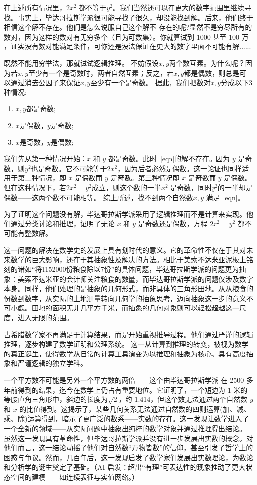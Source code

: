 在上述所有情况里，$2x^2$ 都不等于$y^2$。我们当然还可以在更大的数字范围里继续寻找。事实上，毕达哥拉斯学派很可能寻找了很久，却没能找到解。后来，他们终于相信这个解不存在。他们是怎么说服自己这个解不 存在的呢?显然不是穷尽所有的数对，因为这样的数对有{无穷多个（且为可数集）}。你就算试到 1000 甚至 100 万 ，证实没有数对能满足条件，可你还是没法保证在更大的数字里面不可能有解......

既然不能用穷举法，那就试试逻辑推理。 
不妨假设$x,y$两个数互素。为什么呢？因为若$x,y$至少有一个是奇数时，两者自然互素；反之，若$x,y$都是偶数，则总是可以通过消去公因子来保证$x,y$至少有一个是奇数。
据此，我们把数对$x,y$分成以下3种情况: 
\begin{enumerate}
\item $x,y$都是奇数;
\item $x$是偶数，$y$是奇数;
\item $x$是奇数，$y$是偶数;
\end{enumerate}

我们先从第一种情况开始：$x$ 和 $y$ 都是奇数。此时~\eqref{eqn}的解不存在。因为 $y$ 是奇数，则$y^2$也是奇数。它不可能等于$2x^2$，因为后者必然是偶数。这一论证也同样适用于第二种情况，即 $x$ 是偶数而 $y$ 是奇数。第三种情况即 $x$ 是奇数而 $y$ 是偶数。但在这种情况下，若$2x^2=y^2$成立，则这个数的一半$x^2$ 是奇数，同时$y^2$的一半却是偶数——这两个数不可能相等。
综上所述，找不到两个自然数$x,y$ 满足~\eqref{eqn}。

为了证明这个问题没有解，毕达哥拉斯学派采用了逻辑推理而不是计算来实现。他们通过分类讨论和推理，证明了无论 $x$ 和 $y$ 是奇数还是偶数，方程 $2x^2 = y^2$ 都不可能有整数解。

这一问题的解决在数学史的发展上具有划时代的意义。它的革命性不仅在于其对未来数学的巨大影响，还在于其抽象性及解决的方法。相比于美索不达米亚泥板上铭刻的诸如“将1152000份粮食除以7份”的具体问题，毕达哥拉斯学派的问题更为抽象：美索不达米亚的会计师关注粮食的数量，而毕达哥拉斯学派的问题仅涉及数字本身。同样，他们处理的是抽象的几何形式，而非具体的三角形田地。从从粮食的份数到数字，从实际的土地测量转向几何学的抽象思考，迈向抽象这一步的意义不可小觑。田地的面积无非几平方千米，而抽象的几何对象则可以轻松超越这一尺度，进入无限的范围。

古希腊数学家不再满足于计算结果，而是开始重视推导过程。他们通过严谨的逻辑推理，逐步构建了数学证明和公理系统。
这一从计算到推理的转变，被视为数学的真正诞生，使得数学从日常的计算工具演变为以推理和抽象为核心、具有高度抽象和严谨逻辑的独立学科。

一个平方数不可能是另外一个平方数的两倍——这个由毕达哥拉斯学派 在 2500 多年前得到的结果，迄今在数学上仍占有重要地位。它证明了，一个短边为 1 米的等腰直角三角形中，斜边的长度为$\sqrt{2}$，约 1.414，但这个数无法通过两个自然数 $y$ 和 $x$ 的比值得到。这揭示了，某些几何关系无法通过自然数的四则运算(加、减、乘、除)运算得到，暗示了更广泛的数系——实数的存在。这一发现让数学进入了一个全新的领域——从实际问题中抽象出纯粹的数学对象并通过推理得出结论。
虽然这一发现具有革命性，但毕达哥拉斯学派并没有进一步发展出实数的概念。对他们而言，这一结论动摇了他们对自然数“万物皆数”的信仰，甚至引发了哲学上的困惑与争议。然而，几百年后，这一发现启发了数学家们发展出实数理论，为数论和分析学的诞生奠定了基础。{（AI 启发：超出“有理”可表达性的现象推动了更大状态空间的建模——如连续表征与实值网络。）}

